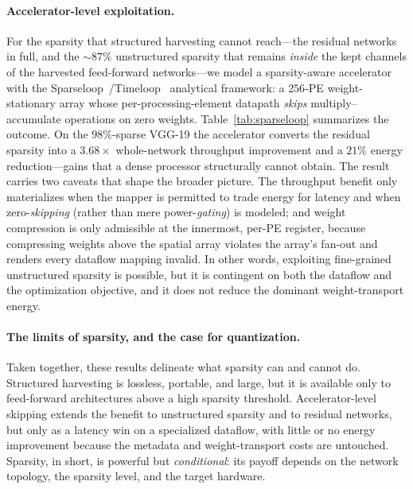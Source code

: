 \paragraph{Accelerator-level exploitation.}
For the sparsity that structured harvesting cannot reach---the residual networks in
full, and the $\sim\!87\%$ unstructured sparsity that remains \emph{inside} the kept
channels of the harvested feed-forward networks---we model a sparsity-aware
accelerator with the Sparseloop~\cite{sparseloop}/Timeloop~\cite{timeloop} analytical
framework: a $256$-PE weight-stationary array whose per-processing-element datapath
\emph{skips} multiply--accumulate operations on zero weights.
Table~\ref{tab:sparseloop} summarizes the outcome. On the $98\%$-sparse VGG-19 the
accelerator converts the residual sparsity into a $3.68\times$ whole-network
throughput improvement and a $21\%$ energy reduction---gains that a dense
processor structurally cannot obtain. The result carries two caveats that shape the
broader picture. The throughput benefit only materializes when the mapper is
permitted to trade energy for latency and when zero-\emph{skipping} (rather than
mere power-\emph{gating}) is modeled; and weight compression is only admissible at
the innermost, per-PE register, because compressing weights above the spatial array
violates the array's fan-out and renders every dataflow mapping invalid. In other
words, exploiting fine-grained unstructured sparsity is possible, but it is
contingent on both the dataflow and the optimization objective, and it does not
reduce the dominant weight-transport energy.


\paragraph{The limits of sparsity, and the case for quantization.}
Taken together, these results delineate what sparsity can and cannot do. Structured
harvesting is lossless, portable, and large, but it is available only to
feed-forward architectures above a high sparsity threshold. Accelerator-level
skipping extends the benefit to unstructured sparsity and to residual networks, but
only as a latency win on a specialized dataflow, with little or no energy
improvement because the metadata and weight-transport costs are untouched. Sparsity,
in short, is powerful but \emph{conditional}: its payoff depends on the network
topology, the sparsity level, and the target hardware.

